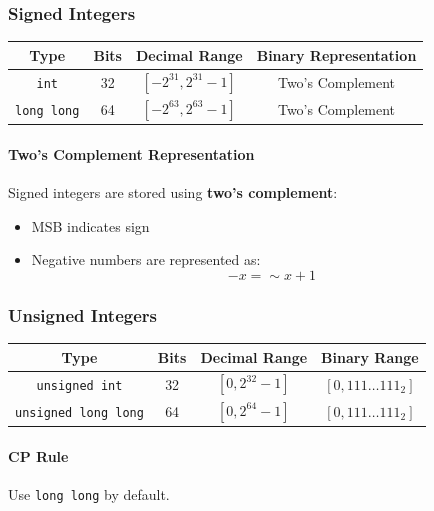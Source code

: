\documentclass[11pt]{article}
\begin{document}
\subsubsection{Signed Integers}

\begin{center}
\begin{tabular}{cccc}
\toprule
Type & Bits & Decimal Range & Binary Representation \\
\midrule
\texttt{int} & 32 &
$[-2^{31}, 2^{31}-1]$ &
Two's Complement \\
\texttt{long long} & 64 &
$[-2^{63}, 2^{63}-1]$ &
Two's Complement \\
\bottomrule
\end{tabular}
\end{center}

\paragraph{Two's Complement Representation}
Signed integers are stored using \textbf{two's complement}:
\begin{itemize}
    \item MSB indicates sign
    \item Negative numbers are represented as:
    \[
    -x = \sim x + 1
    \]
\end{itemize}

\subsubsection{Unsigned Integers}

\begin{center}
\begin{tabular}{cccc}
\toprule
Type & Bits & Decimal Range & Binary Range \\
\midrule
\texttt{unsigned int} & 32 &
$[0, 2^{32}-1]$ &
$[0, 111\ldots111_2]$ \\
\texttt{unsigned long long} & 64 &
$[0, 2^{64}-1]$ &
$[0, 111\ldots111_2]$ \\
\bottomrule
\end{tabular}
\end{center}

\paragraph{CP Rule}
Use \texttt{long long} by default.  

\end{document}

